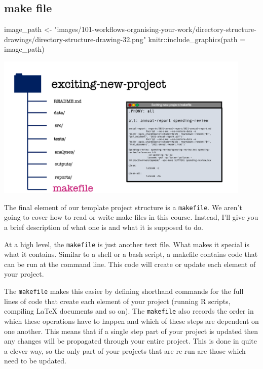 \documentclass[
  letterpaper,
  DIV=11,
  numbers=noendperiod]{scrreprt}
\newenvironment{Shaded}{\begin{snugshade}}{\end{snugshade}}
\newcommand{\AttributeTok}[1]{\textcolor[rgb]{0.40,0.45,0.13}{#1}}
\newcommand{\FunctionTok}[1]{\textcolor[rgb]{0.28,0.35,0.67}{#1}}
\newcommand{\NormalTok}[1]{\textcolor[rgb]{0.00,0.23,0.31}{#1}}
\newcommand{\OtherTok}[1]{\textcolor[rgb]{0.00,0.23,0.31}{#1}}
\newcommand{\SpecialCharTok}[1]{\textcolor[rgb]{0.37,0.37,0.37}{#1}}
\newcommand{\StringTok}[1]{\textcolor[rgb]{0.13,0.47,0.30}{#1}}
\begin{document}
\subsection{make file}\label{make-file}

\begin{Shaded}
\begin{Highlighting}[]
\NormalTok{image\_path }\OtherTok{\textless{}{-}} \StringTok{"images/101{-}workflows{-}organising{-}your{-}work/directory{-}structure{-}drawings/directory{-}structure{-}drawing{-}32.png"}
\NormalTok{knitr}\SpecialCharTok{::}\FunctionTok{include\_graphics}\NormalTok{(}\AttributeTok{path =}\NormalTok{ image\_path)}
\end{Highlighting}
\end{Shaded}

\includegraphics[width=4.8in,height=\textheight]{images/101-workflows-organising-your-work/directory-structure-drawings/directory-structure-drawing-32.png}

The final element of our template project structure is a
\texttt{makefile}. We aren't going to cover how to read or write make
files in this course. Instead, I'll give you a brief description of what
one is and what it is supposed to do.

At a high level, the \texttt{makefile} is just another text file. What
makes it special is what it contains. Similar to a shell or a bash
script, a makefile contains code that can be run at the command line.
This code will create or update each element of your project.

The \texttt{makefile} makes this easier by defining shorthand commands
for the full lines of code that create each element of your project
(running R scripts, compiling LaTeX documents and so on). The
\texttt{makefile} also records the order in which these operations have
to happen and which of these steps are dependent on one another. This
means that if a single step part of your project is updated then any
changes will be propagated through your entire project. This is done in
quite a clever way, so the only part of your projects that are re-run
are those which need to be updated.
\end{document}
